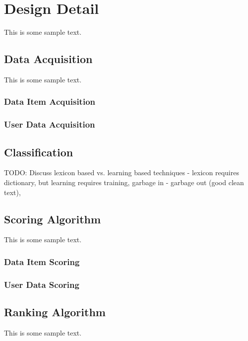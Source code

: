 \chapter{Design Detail}

This is some sample text.

\section{Data Acquisition}

This is some sample text.

\subsection{Data Item Acquisition}

\subsection{User Data Acquisition}

\section{Classification}
TODO: Discuss lexicon based vs. learning based techniques - lexicon requires dictionary, but learning requires training, garbage in - garbage out (good clean text), 

\section{Scoring Algorithm}

This is some sample text.

\subsection{Data Item Scoring}

\subsection{User Data Scoring}

\section{Ranking Algorithm}

This is some sample text.
